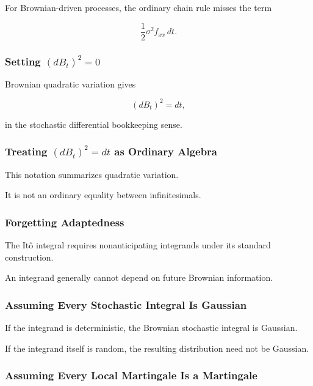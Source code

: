 For Brownian-driven processes, the ordinary chain rule misses the term

\[
\boxed{
\frac12
\sigma^2f_{xx}\,dt.
}
\]

\subsubsection{Setting \((dB_t)^2=0\)}

Brownian quadratic variation gives

\[
\boxed{
(dB_t)^2=dt,
}
\]

in the stochastic differential bookkeeping sense.

\subsubsection{Treating \((dB_t)^2=dt\) as Ordinary Algebra}

This notation summarizes quadratic variation.

It is not an ordinary equality between infinitesimals.

\subsubsection{Forgetting Adaptedness}

The It\^o integral requires nonanticipating integrands under its standard
construction.

An integrand generally cannot depend on future Brownian information.

\subsubsection{Assuming Every Stochastic Integral Is Gaussian}

If the integrand is deterministic, the Brownian stochastic integral is
Gaussian.

If the integrand itself is random, the resulting distribution need not
be Gaussian.

\subsubsection{Assuming Every Local Martingale Is a Martingale}

